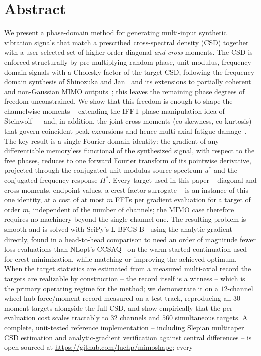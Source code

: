 \documentclass[10pt,a4paper]{article}
\numberwithin{equation}{section}
\begin{document}
\linenumbers

\section*{Abstract}
We present a phase-domain method for generating multi-input synthetic vibration signals that match a prescribed cross-spectral density (CSD) together with a user-selected set of higher-order diagonal \emph{and cross} moments. The CSD is enforced structurally by pre-multiplying random-phase, unit-modulus, frequency-domain signals with a Cholesky factor of the target CSD, following the frequency-domain synthesis of Shinozuka and Jan~\cite{shinozuka1972digital} and its extensions to partially coherent and non-Gaussian MIMO outputs~\cite{smallwood1993coherent,smallwood_nongaussian,cui2011matrix}; this leaves the remaining phase degrees of freedom unconstrained. We show that this freedom is enough to shape the channelwise moments -- extending the IFFT phase-manipulation idea of Steinwolf~\cite{steinwolf2011ifft,steinwolf2011twr,steinwolf_book_ngaussian} -- and, in addition, the joint cross-moments (co-skewness, co-kurtosis) that govern coincident-peak excursions and hence multi-axial fatigue damage~\cite{saathoff2006synthetic}. The key result is a single Fourier-domain identity: the gradient of any differentiable memoryless functional of the synthesized signal, with respect to the free phases, reduces to one forward Fourier transform of its pointwise derivative, projected through the conjugated unit-modulus source spectrum $u^*$ and the conjugated frequency response $H^*$. Every target used in this paper -- diagonal and cross moments, endpoint values, a crest-factor surrogate -- is an instance of this one identity, at a cost of at most $m$ FFTs per gradient evaluation for a target of order $m$, independent of the number of channels; the MIMO case therefore requires no machinery beyond the single-channel one. The resulting problem is smooth and is solved with SciPy's L-BFGS-B~\cite{byrd1995lbfgsb,virtanen2020SciPy} using the analytic gradient directly, found in a head-to-head comparison to need an order of magnitude fewer loss evaluations than NLopt's CCSAQ~\cite{svanberg2002ccsaq,johnson_nlopt} on the warm-started continuation used for crest minimization, while matching or improving the achieved optimum. When the target statistics are estimated from a measured multi-axial record the targets are realizable by construction -- the record itself is a witness -- which is the primary operating regime for the method; we demonstrate it on a $12$-channel wheel-hub force/moment record measured on a test track, reproducing all $30$ moment targets alongside the full CSD, and show empirically that the per-evaluation cost scales tractably to $32$ channels and $560$ simultaneous targets. A complete, unit-tested reference implementation -- including Slepian multitaper CSD estimation and analytic-gradient verification against central differences -- is open-sourced at \url{https://github.com/luchp/mimoshape}; every 
\end{document}
